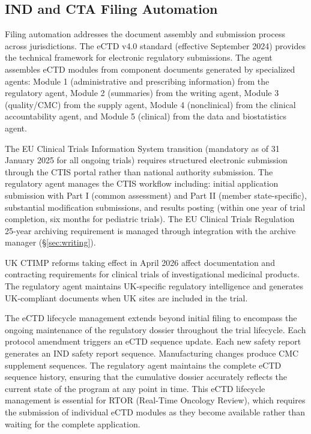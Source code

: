 \subsection{IND and CTA Filing Automation}

Filing automation addresses the document assembly and submission process across jurisdictions.
The eCTD v4.0 standard (effective September 2024) \cite{fda-ectd} provides the technical
framework for electronic regulatory submissions. The agent assembles eCTD modules from
component documents generated by specialized agents: Module 1 (administrative and
prescribing information) from the regulatory agent, Module 2 (summaries) from the writing
agent, Module 3 (quality/CMC) from the supply agent, Module 4 (nonclinical) from the
clinical accountability agent, and Module 5 (clinical) from the data and biostatistics
agent.

The EU Clinical Trials Information System \cite{eu-ctis} transition (mandatory as of 31
January 2025 for all ongoing trials) requires structured electronic submission through the
CTIS portal rather than national authority submission. The regulatory agent manages the CTIS
workflow including: initial application submission with Part I (common assessment) and Part
II (member state-specific), substantial modification submissions, and results posting (within
one year of trial completion, six months for pediatric trials). The EU Clinical Trials
Regulation \cite{eu-ctr} 25-year archiving requirement is managed through integration with
the archive manager (\S\ref{sec:writing}).

UK CTIMP reforms taking effect in April 2026 affect documentation and contracting
requirements for clinical trials of investigational medicinal products. The regulatory agent
maintains UK-specific regulatory intelligence and generates UK-compliant documents when
UK sites are included in the trial.

The eCTD lifecycle management extends beyond initial filing to encompass the ongoing
maintenance of the regulatory dossier throughout the trial lifecycle. Each protocol
amendment triggers an eCTD sequence update. Each new safety report generates an IND
safety report sequence. Manufacturing changes produce CMC supplement sequences. The
regulatory agent maintains the complete eCTD sequence history, ensuring that the
cumulative dossier accurately reflects the current state of the program at any point in
time. This eCTD lifecycle management is essential for RTOR (Real-Time Oncology Review),
which requires the submission of individual eCTD modules as they become available rather
than waiting for the complete application.

